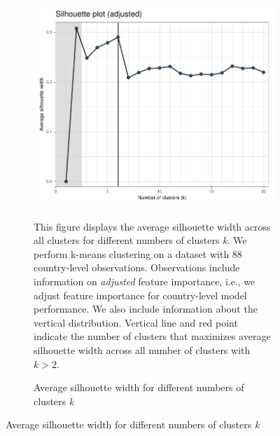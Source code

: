 \begin{figure}[ht!]
\centering
  \caption{Silhouette analysis}\label{fig:Silhouette}
   \begin{subfigure}[b]{\textwidth}
   \centering
   \caption{Average silhouette width for different numbers of clusters \textit{k}} \label{fig:G3_silhouette_2}
   \includegraphics{Figures_Appendix/Figure_Silhouette_2.pdf}
   \begin{subcaption2}
     This figure displays the average silhouette width across all clusters for different numbers of clusters \textit{k}. We perform k-means clustering on a dataset with 88 country-level observations. Observations include information on \textit{adjusted} feature importance, i.e., we adjust feature importance for country-level model performance. We also include information about the vertical distribution. Vertical line and red point indicate the number of clusters that maximizes average silhouette width across all number of clusters with $k>2$.
   \end{subcaption2}
   \end{subfigure}
 \end{figure}
 \clearpage

